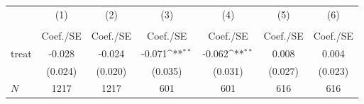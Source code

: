 {
\def\sym#1{\ifmmode^{#1}\else\(^{#1}\)\fi}
\begin{tabular}{l*{6}{c}}
\hline\hline
            &\multicolumn{1}{c}{(1)}&\multicolumn{1}{c}{(2)}&\multicolumn{1}{c}{(3)}&\multicolumn{1}{c}{(4)}&\multicolumn{1}{c}{(5)}&\multicolumn{1}{c}{(6)}\\
            &\multicolumn{1}{c}{} &\multicolumn{1}{c}{} &\multicolumn{1}{c}{} &\multicolumn{1}{c}{} &\multicolumn{1}{c}{} &\multicolumn{1}{c}{} \\
            &    Coef./SE         &    Coef./SE         &    Coef./SE         &    Coef./SE         &    Coef./SE         &    Coef./SE         \\
\hline
treat       &      -0.028         &      -0.024         &      -0.071\sym{**} &      -0.062\sym{**} &       0.008         &       0.004         \\
            &     (0.024)         &     (0.020)         &     (0.035)         &     (0.031)         &     (0.027)         &     (0.023)         \\
\hline
\(N\)       &        1217         &        1217         &         601         &         601         &         616         &         616         \\
\hline\hline
\end{tabular}
}
